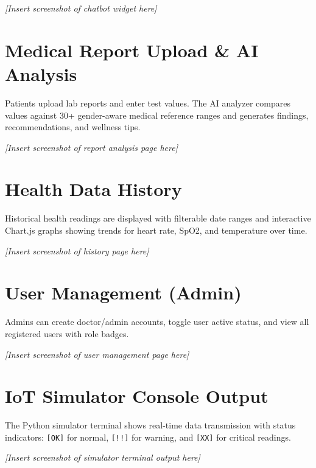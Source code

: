 
\noindent\textit{[Insert screenshot of chatbot widget here]}

\section{Medical Report Upload \& AI Analysis}
Patients upload lab reports and enter test values. The AI analyzer compares values against 30+ gender-aware medical reference ranges and generates findings, recommendations, and wellness tips.


\noindent\textit{[Insert screenshot of report analysis page here]}

\section{Health Data History}
Historical health readings are displayed with filterable date ranges and interactive Chart.js graphs showing trends for heart rate, SpO2, and temperature over time.

\noindent\textit{[Insert screenshot of history page here]}

\section{User Management (Admin)}
Admins can create doctor/admin accounts, toggle user active status, and view all registered users with role badges.

\noindent\textit{[Insert screenshot of user management page here]}

\section{IoT Simulator Console Output}
The Python simulator terminal shows real-time data transmission with status indicators: \texttt{[OK]} for normal, \texttt{[!!]} for warning, and \texttt{[XX]} for critical readings.

\noindent\textit{[Insert screenshot of simulator terminal output here]}
